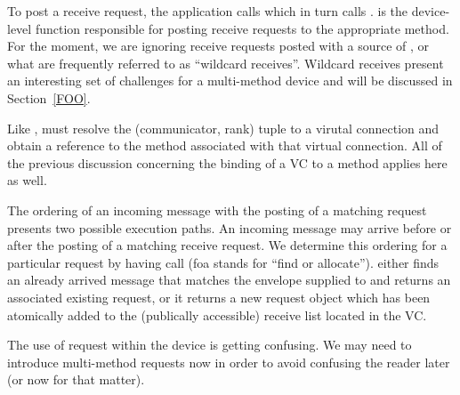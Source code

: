 To post a receive request, the application calls  which in
turn calls .   is the device-level
function responsible for posting receive requests to the appropriate method.
For the moment, we are ignoring receive requests posted with a source of
, or what are frequently referred to as ``wildcard
receives''.  Wildcard receives present an interesting set of challenges for a
multi-method device and will be discussed in Section~\ref{FOO}.

Like ,  must resolve the (communicator, rank)
tuple to a virutal connection and obtain a reference to the method associated
with that virtual connection.  All of the previous discussion concerning the
binding of a VC to a method applies here as well.

The ordering of an incoming message with the posting of a matching request
presents two possible execution paths.  An incoming message may arrive before
or after the posting of a matching receive request.  We determine this ordering
for a particular request by having  call
 (foa stands for ``find or allocate'').
 either finds an already arrived message that matches
the envelope supplied to  and returns an associated existing
request, or it returns a new request object which has been atomically added to
the (publically accessible) receive list located in the VC.

\begin{cmt}
  The use of request within the device is getting confusing.  We may need to
  introduce multi-method requests now in order to avoid confusing the reader
  later (or now for that matter).
\end{cmt}





